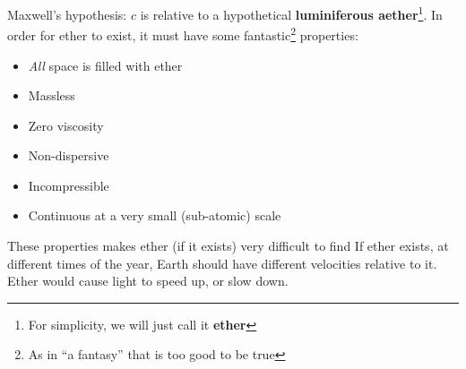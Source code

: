 Maxwell's hypothesis: $c$ is relative to a hypothetical \textbf{luminiferous
  aether}\footnote{For simplicity, we will just call it \textbf{ether}}. In
order for ether to exist, it must have some fantastic\footnote{As in ``a
fantasy'' that is too good to be true} properties:
\begin{itemize}
\item \emph{All} space is filled with ether
\item Massless
\item Zero viscosity
\item Non-dispersive
\item Incompressible
\item Continuous at a very small (sub-atomic) scale
 \end{itemize}
These properties makes ether (if it exists) very difficult to find
%
%
%
%
If ether exists, at different times of the year, Earth should have different
velocities relative to it. Ether would cause light to speed up, or slow down.
\begin{center}
\end{center}
%
%  
%
%
